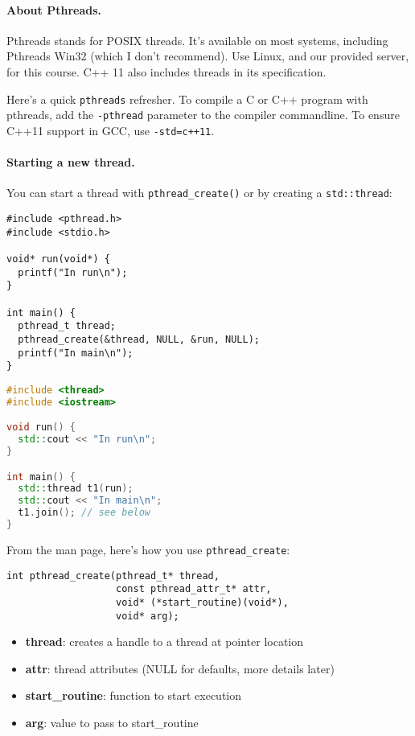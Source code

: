 \documentclass[11pt]{article}
\begin{document}
\paragraph{About Pthreads.} Pthreads stands for POSIX threads. It's available
on most systems, including Pthreads Win32 (which I don't recommend).
Use Linux, and our provided server, for this course. C++ 11 also includes threads
in its specification.

Here's a quick {\tt pthreads} refresher. To compile a C or C++ program
with pthreads, add the {\tt -pthread} parameter to the compiler
commandline. To ensure C++11 support in GCC, use \verb!-std=c++11!.

\paragraph{Starting a new thread.} You can start a thread with
\verb+pthread_create()+ or by creating a \verb+std::thread+:

{\small
  \begin{minipage}{.55\textwidth}
\begin{lstlisting}
#include <pthread.h>
#include <stdio.h>

void* run(void*) {
  printf("In run\n");
}

int main() {
  pthread_t thread;
  pthread_create(&thread, NULL, &run, NULL);
  printf("In main\n");
}
\end{lstlisting}
  \end{minipage} 
  \begin{minipage}{.4\textwidth}
\begin{lstlisting}[language=C++]
#include <thread>
#include <iostream>

void run() {
  std::cout << "In run\n";
}

int main() {
  std::thread t1(run);
  std::cout << "In main\n";
  t1.join(); // see below
}
\end{lstlisting}
  \end{minipage}
}

From the man page, here's how you use \verb+pthread_create+:
\begin{lstlisting}
int pthread_create(pthread_t* thread, 
                   const pthread_attr_t* attr,
                   void* (*start_routine)(void*),
                   void* arg);
\end{lstlisting}

\begin{itemize}
\item  {\bf thread}: creates a handle to a thread at pointer location

\item  {\bf attr}: thread attributes (NULL for defaults, more details later)

\item  {\bf start\_routine}: function to start execution

\item   {\bf arg}: value to pass to start\_routine
\end{itemize}
\end{document}
